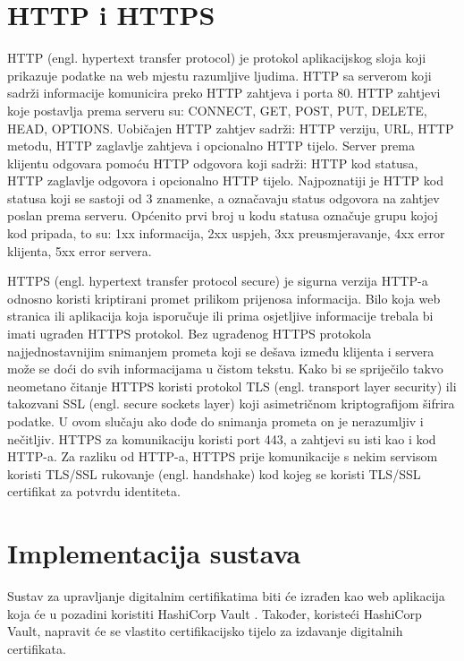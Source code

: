 \documentclass[]{foi}
\begin{document}
\chapter{HTTP i HTTPS}

HTTP (engl. hypertext transfer protocol) je protokol aplikacijskog sloja koji prikazuje podatke na web mjestu razumljive ljudima.
HTTP sa serverom koji sadrži informacije komunicira preko HTTP zahtjeva i porta 80.
HTTP zahtjevi koje postavlja prema serveru su: CONNECT, GET, POST, PUT, DELETE, HEAD, OPTIONS.
Uobičajen HTTP zahtjev sadrži: HTTP verziju, URL, HTTP metodu, HTTP zaglavlje zahtjeva i opcionalno HTTP tijelo.
Server prema klijentu odgovara pomoću HTTP odgovora koji sadrži: HTTP kod statusa, HTTP zaglavlje odgovora i opcionalno HTTP tijelo.
Najpoznatiji je HTTP kod statusa koji se sastoji od 3 znamenke, a označavaju status odgovora na zahtjev poslan prema serveru.
Općenito prvi broj u kodu statusa označuje grupu kojoj kod pripada, to su: 1xx informacija, 2xx uspjeh, 3xx preusmjeravanje, 4xx error klijenta, 5xx error servera.
\cite{cloudflare-http}

HTTPS (engl. hypertext transfer protocol secure) je sigurna verzija HTTP-a odnosno koristi kriptirani promet prilikom prijenosa informacija.
Bilo koja web stranica ili aplikacija koja isporučuje ili prima osjetljive informacije trebala bi imati ugrađen HTTPS protokol.
Bez ugrađenog HTTPS protokola najjednostavnijim snimanjem prometa koji se dešava između klijenta i servera može se doći do svih informacijama u čistom tekstu.
Kako bi se spriječilo takvo neometano čitanje HTTPS koristi protokol TLS (engl. transport layer security) ili takozvani SSL (engl. secure sockets layer) koji asimetričnom kriptografijom šifrira podatke.
U ovom slučaju ako dođe do snimanja prometa on je nerazumljiv i nečitljiv.
HTTPS za komunikaciju koristi port 443, a zahtjevi su isti kao i kod HTTP-a.
Za razliku od HTTP-a, HTTPS prije komunikacije s nekim servisom koristi TLS/SSL rukovanje (engl. handshake) kod kojeg se koristi TLS/SSL certifikat za potvrdu identiteta.
\cite{cloudflare-https}

\chapter{Implementacija sustava}

Sustav za upravljanje digitalnim certifikatima biti će izrađen kao web aplikacija koja će u pozadini koristiti HashiCorp Vault \cite{hashicorp-vault-what-is}.
Također, koristeći HashiCorp Vault, napravit će se vlastito certifikacijsko tijelo za izdavanje digitalnih certifikata.
\end{document}
